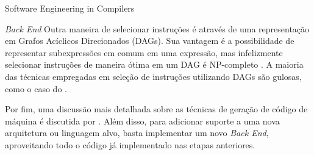 \begin{section}{Software Engineering in Compilers}
\begin{subsection}{\textit{Back End}}
Outra maneira de selecionar instruções é através de uma representação em 
Grafos Acíclicos Direcionados (DAGs). Sua vantagem é a possibilidade de representar
subexpressões em comum em uma expressão, mas infelizmente selecionar instruções
de maneira ótima em um DAG é NP-completo \citep{koes2008near}.  A maioria das
técnicas empregadas em seleção de instruções utilizando DAGs são gulosas, como
o caso do \cite{llvm_insn_selection}.

Por fim, uma discussão mais detalhada sobre
as técnicas de geração de código de máquina é discutida por
\cite{blindell2016instruction}. Além disso, para
adicionar suporte a uma nova arquitetura ou linguagem
alvo, basta implementar um novo \textit{Back End}, aproveitando todo
o código já implementado nas etapas anteriores.

\end{subsection}


\end{section}


